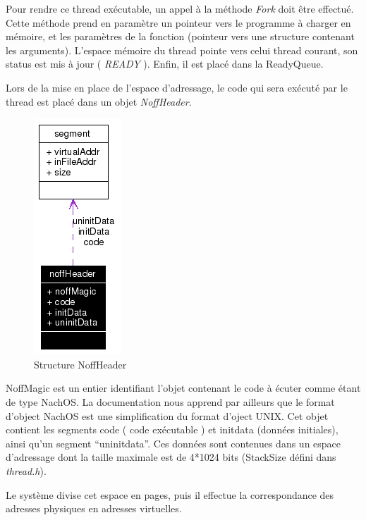 \documentclass[a4paper,10pt]{article}
\begin{document}
Pour rendre ce thread exécutable, un appel à la méthode \textit{Fork} doit être effectué. Cette méthode prend en paramètre un pointeur vers le programme à charger en mémoire, et
les paramètres de la fonction (pointeur vers une structure contenant les arguments). L'espace mémoire du thread pointe vers celui thread courant,
son status est mis à jour ( \textit{READY} ). Enfin, il est placé dans la ReadyQueue.

\newpage

Lors de la mise en place de l'espace d'adressage, le code qui sera exécuté par le thread est placé dans un objet \textit{NoffHeader}.

\begin{figure}[h]
  \begin{center}
    \includegraphics[scale=0.4]{./structnoff.png}
   \caption{\label{structnoff} Structure NoffHeader}
  \end{center}
\end{figure}

NoffMagic est un entier identifiant l'objet contenant le code à écuter comme étant de type NachOS.
La documentation nous apprend par ailleurs que le format d'object NachOS est une simplification du format d'oject UNIX.
Cet objet contient les segments code ( code exécutable ) et initdata (données initiales), ainsi qu'un segment ``uninitdata''.
Ces données sont contenues dans un espace d'adressage dont la taille maximale est de 4*1024 bits (StackSize défini dans \textit{thread.h}).
\vspace{0.5cm}

Le système divise cet espace en pages, puis il effectue la correspondance des adresses physiques en adresses virtuelles.
\end{document}

